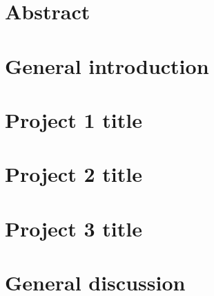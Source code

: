 \documentclass[12pt, twoside, hidelinks]{report} %
\begin{document}
\chapter*{Abstract}
\markright{}


 \tableofcontents
 \listoffigures
 \listoftables

 \chapter{General introduction}
\setcounter{page}{1}


\chapter[Shorter title for TOC - Project 1]{Project 1 title} %


\chapter[Project 2]{Project 2 title} %

 
\chapter[Project 3]{Project 3 title} %
 
 
\chapter{General discussion}


\onehalfspacing  


\markright{}

 
\end{document}

